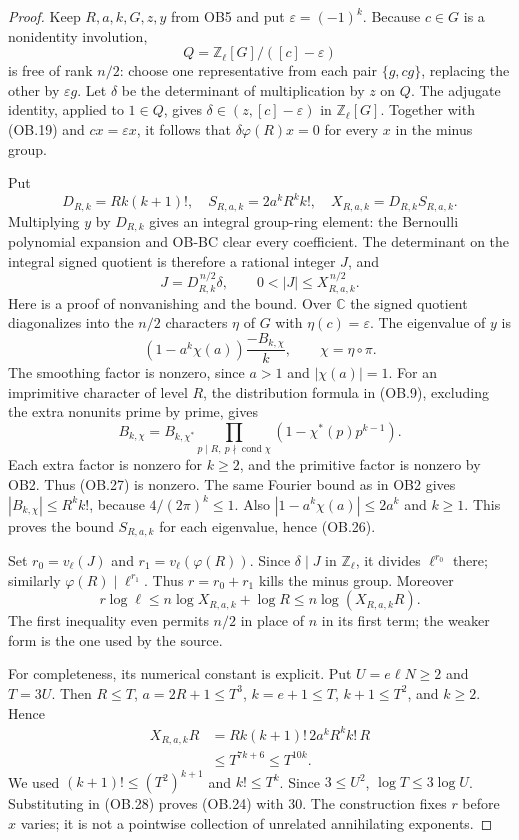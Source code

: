 \begin{proof}
Keep $R,a,k,G,z,y$ from OB5 and put $\varepsilon=(-1)^k$.
Because $c\in G$ is a nonidentity involution,
\[
       Q=\mathbb Z_\ell[G]/([c]-\varepsilon)
\]
is free of rank $n/2$: choose one representative from each pair
$\{g,cg\}$, replacing the other by $\varepsilon g$.
Let $\delta$ be the determinant of multiplication by $z$ on $Q$.
The adjugate identity, applied to $1\in Q$, gives
$\delta\in(z,[c]-\varepsilon)$ in $\mathbb Z_\ell[G]$.
Together with (OB.19) and $cx=\varepsilon x$, it follows that
$\delta\varphi(R)x=0$ for every $x$ in the minus group.

Put
\[
 D_{R,k}=Rk(k+1)!,\quad
 S_{R,a,k}=2a^kR^kk!,\quad
 X_{R,a,k}=D_{R,k}S_{R,a,k}.                    \tag{OB.25}
\]
Multiplying $y$ by $D_{R,k}$ gives an integral group-ring element:
the Bernoulli polynomial expansion and OB-BC clear every coefficient.
The determinant on the integral signed quotient is therefore a
rational integer $J$, and
\[
      J=D_{R,k}^{\,n/2}\delta,\qquad
      0<|J|\le X_{R,a,k}^{\,n/2}.                  \tag{OB.26}
\]
Here is a proof of nonvanishing and the bound.  Over $\mathbb C$ the
signed quotient diagonalizes into the $n/2$ characters $\eta$ of
$G$ with $\eta(c)=\varepsilon$.  The eigenvalue of $y$ is
\[
       (1-a^k\chi(a))\frac{-B_{k,\chi}}{k},
               \qquad \chi=\eta\circ\pi.
 \tag{OB.27}
\]
The smoothing factor is nonzero, since $a>1$ and $|\chi(a)|=1$.
For an imprimitive character of level $R$, the distribution formula
in (OB.9), excluding the extra nonunits prime by prime, gives
\[
 B_{k,\chi}=B_{k,\chi^*}
       \prod_{p\mid R,\ p\nmid\operatorname{cond}\chi}
                         (1-\chi^*(p)p^{k-1}).
\]
Each extra factor is nonzero for $k\ge2$, and the primitive factor
is nonzero by OB2.  Thus (OB.27) is nonzero.  The same Fourier bound
as in OB2 gives $|B_{k,\chi}|\le R^kk!$, because
$4/(2\pi)^k\le1$.  Also
$|1-a^k\chi(a)|\le2a^k$ and $k\ge1$.
This proves the bound $S_{R,a,k}$ for each eigenvalue, hence (OB.26).

Set $r_0=v_\ell(J)$ and $r_1=v_\ell(\varphi(R))$.
Since $\delta\mid J$ in $\mathbb Z_\ell$, it divides
$\ell^{r_0}$ there; similarly $\varphi(R)\mid\ell^{r_1}$.
Thus $r=r_0+r_1$ kills the minus group.  Moreover
\[
 r\log\ell\le n\log X_{R,a,k}+\log R
                    \le n\log(X_{R,a,k}R).          \tag{OB.28}
\]
The first inequality even permits $n/2$ in place of $n$ in its
first term; the weaker form is the one used by the source.

For completeness, its numerical constant is explicit.  Put
$U=e\ell N\ge2$ and $T=3U$.  Then
$R\le T$, $a=2R+1\le T^3$, $k=e+1\le T$,
$k+1\le T^2$, and $k\ge2$.  Hence
\[
 \begin{split}
 X_{R,a,k}R
 &=Rk(k+1)!\,2a^kR^kk!\,R\\
 &\le T^{7k+6}\le T^{10k}.
 \end{split}
\]
We used $(k+1)!\le(T^2)^{k+1}$ and $k!\le T^k$.
Since $3\le U^2$, $\log T\le3\log U$.
Substituting in (OB.28) proves (OB.24) with $30$.
The construction fixes $r$ before $x$ varies; it is not a
pointwise collection of unrelated annihilating exponents.
\end{proof}

